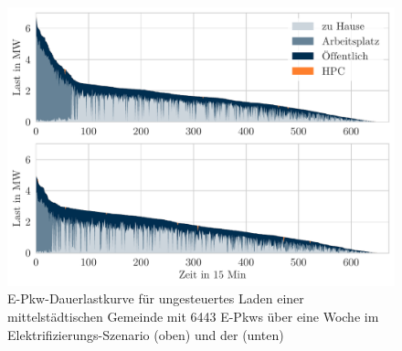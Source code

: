 \begin{figure}[H]
    \centering
    \includegraphics[width=\textwidth]{Bilder/example_load_duration_curve}
    \caption{E-Pkw-Dauerlastkurve für ungesteuertes Laden einer mittelstädtischen Gemeinde mit \num{6443} E-Pkws über eine Woche im Elektrifizierungs-Szenario (oben) und der \SzeFirmenparkplatz (unten)}\label{fig:example_load_curve}
\end{figure}